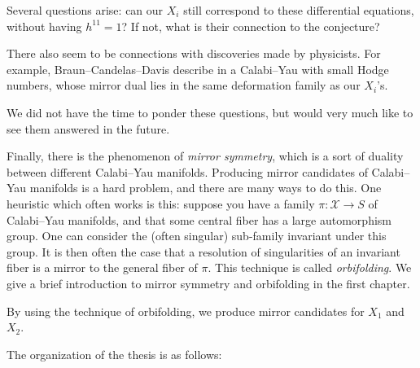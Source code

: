 Several questions arise: can our $X_i$ still correspond to these differential equations, without having $h^{11}=1$? If not, what is their connection to the conjecture?

There also seem to be connections with discoveries made by physicists. For example, Braun--Candelas--Davis describe in \cite{braun_smallhodgenumbers} a Calabi--Yau with small Hodge numbers, whose mirror dual lies in the same deformation family as our $X_i$'s.

We did not have the time to ponder these questions, but would very much like to see them answered in the future.


\hfill \break

Finally, there is the phenomenon of \emph{mirror symmetry}, which is a sort of duality between different Calabi--Yau manifolds. Producing mirror candidates of Calabi--Yau manifolds is a hard problem, and there are many ways to do this. One heuristic which often works is this: suppose you have a family $\pi: \mathscr X \to S$ of Calabi--Yau manifolds, and that some central fiber has a large automorphism group. One can consider the (often singular) sub-family invariant under this group. It is then often the case that a resolution of singularities of an invariant fiber is a mirror to the general fiber of $\pi$. This technique is called \emph{orbifolding}. We give a brief introduction to mirror symmetry and orbifolding in the first chapter.

By using the technique of orbifolding, we produce mirror candidates for $X_1$ and $X_2$.

\hfill \break

The organization of the thesis is as follows:

